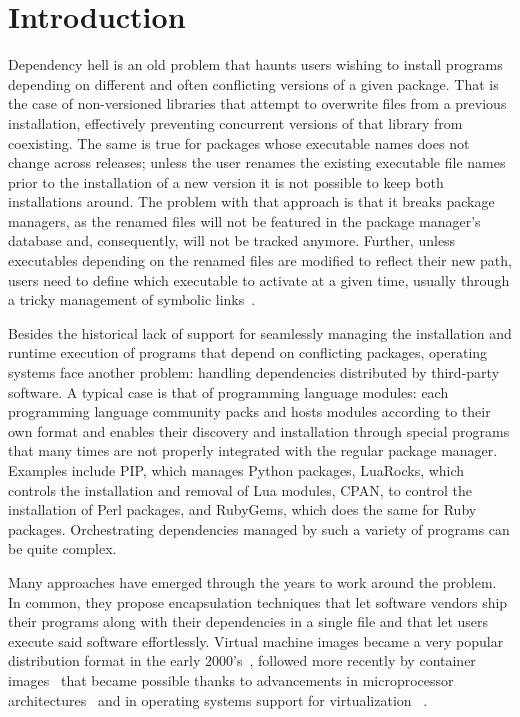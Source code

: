 \documentclass[sigplan, anonymous, 10pt]{acmart}
\begin{document}
\section{Introduction}
Dependency hell is an old problem that haunts users wishing to install programs depending on
different and often conflicting versions of a given package. That is the case of non-versioned
libraries that attempt to overwrite files from a previous installation, effectively preventing
concurrent versions of that library from coexisting. The same is true for packages whose executable
names does not change across releases; unless the user renames the existing executable file names
prior to the installation of a new version it is not possible to keep both installations around.
The problem with that approach is that it breaks package managers, as the renamed files will not
be featured in the package manager's database and, consequently, will not be tracked anymore. Further, 
unless executables depending on the renamed files are modified to reflect their new path, users need
to define which executable to activate at a given time, usually through a tricky management of
symbolic links~\cite{redhat2002:alternatives}.

Besides the historical lack of support for seamlessly managing the installation and runtime
execution of programs that depend on conflicting packages, operating systems face another problem:
handling dependencies distributed by third-party software. A typical case is that of programming
language modules: each programming language community packs and hosts modules according to their own
format and enables their discovery and installation through special programs that many times are not
properly integrated with the regular package manager. Examples include PIP, which manages Python
packages, LuaRocks, which controls the installation and removal of Lua modules, CPAN, to control the
installation of Perl packages, and RubyGems, which does the same for Ruby packages. Orchestrating
dependencies managed by such a variety of programs can be quite complex.

Many approaches have emerged through the years to work around the problem. In common, they propose
encapsulation techniques that let software vendors ship their programs along with their dependencies
in a single file and that let users execute said software effortlessly. Virtual machine images
became a very popular distribution format in the early 2000's~\cite{smith2005:vm}, followed more recently by
container images~\cite{fink2014:docker} that became possible thanks to advancements in microprocessor
architectures~\cite{uhlig2005:vtx, amd2005:svm} and in operating systems support for virtualization
~\cite{russell2008:virtio, dall2014:kvm+arm, kivity2007:kvm}. 
\end{document}
